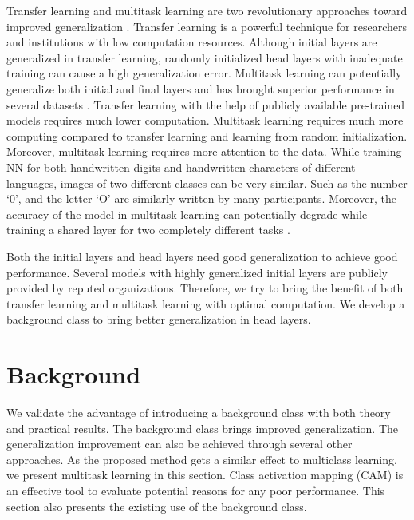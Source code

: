 \documentclass{article}
\begin{document}
Transfer learning and multitask learning are two revolutionary approaches toward improved generalization \cite{kolesnikov2020big, gesmundo2022evolutionary}. Transfer learning is a powerful technique for researchers and institutions with low computation resources. Although initial layers are generalized in transfer learning, randomly initialized head layers with inadequate training can cause a high generalization error. Multitask learning can potentially generalize both initial and final layers and has brought superior performance in several datasets \cite{gesmundo2022evolutionary}. Transfer learning with the help of publicly available pre-trained models requires much lower computation. Multitask learning requires much more computing compared to transfer learning and learning from random initialization. Moreover, multitask learning requires more attention to the data. While training NN for both handwritten digits and handwritten characters of different languages, images of two different classes can be very similar. Such as the number `0', and the letter `O' are similarly written by many participants. Moreover, the accuracy of the model in multitask learning can potentially degrade while training a shared layer for two completely different tasks \cite{kokiopoulou2021flexible, standley2020tasks}.  
 

Both the initial layers and head layers need good generalization to achieve good performance. Several models with highly generalized initial layers are publicly provided by reputed organizations. Therefore, we try to bring the benefit of both transfer learning and multitask learning with optimal computation. We develop a background class to bring better generalization in head layers.


\section{Background}
We validate the advantage of introducing a background class with both theory and practical results. The background class brings improved generalization. The generalization improvement can also be achieved through several other approaches. As the proposed method gets a similar effect to multiclass learning, we present multitask learning in this section. Class activation mapping (CAM) is an effective tool to evaluate potential reasons for any poor performance. This section also presents the existing use of the background class.
\end{document}
